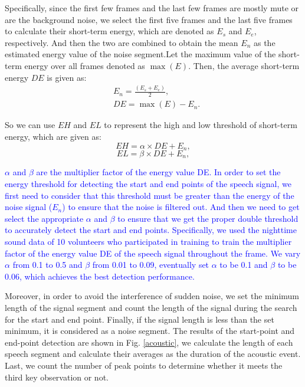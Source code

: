 Specifically, since the first few frames and the last few frames are mostly mute or are the background noise, we select the first five
frames and the last five frames to calculate their short-term energy, which are denoted as $E_s$ and $E_e$, respectively. And then the two
are combined to obtain the mean $E_n$ as the estimated energy value of the noise segment.Let the maximum value of the short-term energy
over all frames denoted as $\max (E)$. Then, the average short-term energy $DE$ is given as:
\begin{eqnarray}
      &E_n = \frac{(E_s+E_e)}{2}, \\
      &DE = \max (E)-E_n.\label{eq:DE}
\end{eqnarray}

So we can use $EH$ and $EL$ to represent the high and low threshold of short-term energy, which are given as:
\begin{equation}
      EH=\alpha \times DE+E_n,
\end{equation}
\begin{equation}
    EL=\beta \times DE+E_n,
\end{equation}

 \textcolor{blue}{$\alpha$ and $\beta$ are the multiplier factor of the energy value DE. In order to set the energy threshold for detecting the start and end points of the speech signal, we first need to consider that this threshold must be greater than the energy of the noise signal ($E_n$) to ensure that the noise is filtered out. And then we need to get select the appropriate $\alpha$ and $\beta$ to ensure that we get the proper double threshold to accurately detect the start and end points. Specifically, we used the nighttime sound data of 10 volunteers who participated in training to train the multiplier factor of the energy value DE of the speech signal throughout the frame. We vary $\alpha$ from 0.1 to 0.5 and $\beta$ from 0.01 to 0.09, eventually set $\alpha$ to be 0.1 and $\beta$ to be 0.06, which achieves the best detection performance.}

 Moreover, in order to avoid the interference of sudden noise, we set the minimum length of the signal segment and count the length of the signal during the search for the start and end point. Finally, if the signal length is less than the set minimum, it is considered as a noise segment. The results of the start-point and end-point detection are shown in Fig. \ref{acoustic}, we calculate the length of each speech segment and calculate their averages as the duration of the acoustic event. Last, we count the number of peak points to determine whether it meets the third key observation or not.



